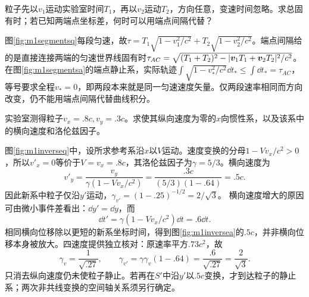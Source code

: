 \begin{exercise}\label{ex:m1propersegments}
粒子先以$v_1$运动实验室时间$T_1$，再以$v_2$运动$T_2$，方向任意，变速时间忽略。求总固有时；若已知两端点坐标差，何时可以用端点间隔代替？
\end{exercise}
\begin{solution}
图\ref{fig:m1segmentsq}每段匀速，故$\tau=T_1\sqrt{1-v_1^2/c^2}+T_2\sqrt{1-v_2^2/c^2}$。端点间隔给的是直接连接两端的匀速世界线固有时$\tau_{AC}=\sqrt{(T_1+T_2)^2-|\bm{v}_1T_1+\bm{v}_2T_2|^2/c^2}$。
在图\ref{fig:m1segmentsa}的端点静止系，实际轨迹$\int\sqrt{1-v_*^2/c^2}\dd t_*\leq\int\dd t_*=\tau_{AC}$，等号要求全程$v_*=0$，即两段本来就是同一匀速速度矢量。仅两段速率相同而方向改变，仍不能用端点间隔代替曲线积分。
\end{solution}

\begin{exercise}\label{ex:m1inversevel}
实验室测得粒子$v_x=.8c,v_y=.3c$。求使其纵向速度为零的$x$向惯性系，以及该系中的横向速度和洛伦兹因子。
\end{exercise}
\begin{solution}
图\ref{fig:m1inverseq}中，设所求参考系沿$x$以$V$运动。速度变换的分母$1-Vv_x/c^2>0$，所以$v'_x=0$等价于$V=v_x=.8c$，其洛伦兹因子为$\gamma=5/3$。横向速度为
\[
 v'_y=\frac{v_y}{\gamma(1-Vv_x/c^2)}
 =\frac{.3c}{(5/3)(1-.64)}=.5c.
\]
因此新系中粒子仅沿$y'$运动，$\gamma_{v'}=(1-.25)^{-1/2}=2/\sqrt3$。
横向速度增大的原因可由微小事件差看出：$\dd y'=\dd y$，而
\[
 \dd t'=\gamma(1-Vv_x/c^2)\dd t=.6\dd t.
\]
相同横向位移除以更短的新系坐标时间，得到图\ref{fig:m1inversea}的$.5c$，并非横向位移本身被放大。四速度提供独立核对：原速率平方$.73c^2$，故
\[
 \gamma_v=\frac1{\sqrt{.27}},\qquad
 \gamma_{v'}=\gamma\gamma_v(1-.64)
 =\frac{.6}{\sqrt{.27}}=\frac2{\sqrt3}.
\]
只消去纵向速度仍未使粒子静止。若再在$S'$中沿$y'$以$.5c$变换，才到达粒子的静止系；两次非共线变换的空间轴关系须另行确定。
\end{solution}

